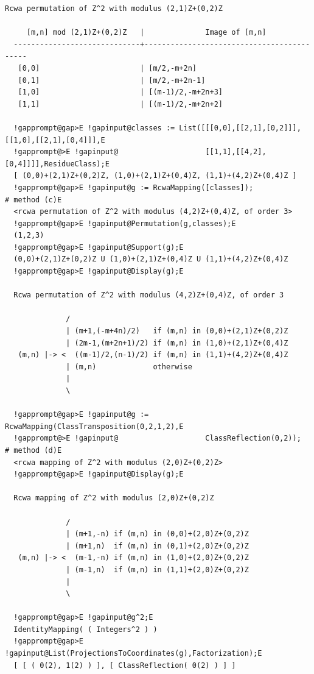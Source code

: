 \documentclass[a4paper,11pt]{report}
\begin{document}
{{{\begin{Verbatim}[commandchars=!@E,fontsize=\small,frame=single,label=Example]
  Rcwa permutation of Z^2 with modulus (2,1)Z+(0,2)Z
  
     [m,n] mod (2,1)Z+(0,2)Z   |              Image of [m,n]
  -----------------------------+-------------------------------------------
   [0,0]                       | [m/2,-m+2n]
   [0,1]                       | [m/2,-m+2n-1]
   [1,0]                       | [(m-1)/2,-m+2n+3]
   [1,1]                       | [(m-1)/2,-m+2n+2]
  
  !gapprompt@gap>E !gapinput@classes := List([[[0,0],[[2,1],[0,2]]],[[1,0],[[2,1],[0,4]]],E
  !gapprompt@>E !gapinput@                    [[1,1],[[4,2],[0,4]]]],ResidueClass);E
  [ (0,0)+(2,1)Z+(0,2)Z, (1,0)+(2,1)Z+(0,4)Z, (1,1)+(4,2)Z+(0,4)Z ]
  !gapprompt@gap>E !gapinput@g := RcwaMapping([classes]);                             # method (c)E
  <rcwa permutation of Z^2 with modulus (4,2)Z+(0,4)Z, of order 3>
  !gapprompt@gap>E !gapinput@Permutation(g,classes);E
  (1,2,3)
  !gapprompt@gap>E !gapinput@Support(g);E
  (0,0)+(2,1)Z+(0,2)Z U (1,0)+(2,1)Z+(0,4)Z U (1,1)+(4,2)Z+(0,4)Z
  !gapprompt@gap>E !gapinput@Display(g);E
  
  Rcwa permutation of Z^2 with modulus (4,2)Z+(0,4)Z, of order 3
  
              /
              | (m+1,(-m+4n)/2)   if (m,n) in (0,0)+(2,1)Z+(0,2)Z
              | (2m-1,(m+2n+1)/2) if (m,n) in (1,0)+(2,1)Z+(0,4)Z
   (m,n) |-> <  ((m-1)/2,(n-1)/2) if (m,n) in (1,1)+(4,2)Z+(0,4)Z
              | (m,n)             otherwise
              |
              \
  
  !gapprompt@gap>E !gapinput@g := RcwaMapping(ClassTransposition(0,2,1,2),E
  !gapprompt@>E !gapinput@                    ClassReflection(0,2));                  # method (d)E
  <rcwa mapping of Z^2 with modulus (2,0)Z+(0,2)Z>
  !gapprompt@gap>E !gapinput@Display(g);E
  
  Rcwa mapping of Z^2 with modulus (2,0)Z+(0,2)Z
  
              /
              | (m+1,-n) if (m,n) in (0,0)+(2,0)Z+(0,2)Z
              | (m+1,n)  if (m,n) in (0,1)+(2,0)Z+(0,2)Z
   (m,n) |-> <  (m-1,-n) if (m,n) in (1,0)+(2,0)Z+(0,2)Z
              | (m-1,n)  if (m,n) in (1,1)+(2,0)Z+(0,2)Z
              |
              \
  
  !gapprompt@gap>E !gapinput@g^2;E
  IdentityMapping( ( Integers^2 ) )
  !gapprompt@gap>E !gapinput@List(ProjectionsToCoordinates(g),Factorization);E
  [ [ ( 0(2), 1(2) ) ], [ ClassReflection( 0(2) ) ] ]
\end{Verbatim}
 }

}}
\end{document}

